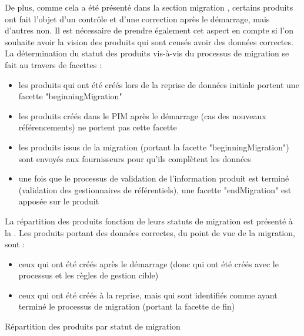                 De plus, comme cela a été présenté dans la section migration , certains produits ont fait l'objet d'un contrôle et d'une correction après le démarrage, mais d'autres non.
                Il est nécessaire de prendre également cet aspect en compte si l'on souhaite avoir la vision des produits qui sont censés avoir des données correctes.
                La détermination du statut des produits vis-à-vis du processus de migration se fait au travers de facettes :
                \begin{itemize}
                    \item les produits qui ont été créés lors de la reprise de données initiale portent une facette "beginningMigration"
                    \item les produits créés dans le PIM après le démarrage (cas des nouveaux référencements) ne portent pas cette facette
                    \item les produits issus de la migration (portant la facette "beginningMigration") sont envoyés aux fournisseurs pour qu'ils complètent les données 
                    \item une fois que le processus de validation de l'information produit est terminé (validation des gestionnaires de référentiels), une facette "endMigration" est apposée sur le produit
                \end{itemize}
                La répartition des produits fonction de leurs statuts de migration est présenté à la .
                Les produits portant des données correctes, du point de vue de la migration, sont : 
                \begin{itemize}
                    \item ceux qui ont été créés après le démarrage (donc qui ont été créés avec le processus et les règles de gestion cible)
                    \item ceux qui ont été créés à la reprise, mais qui sont identifiés comme ayant terminé le processus de migration (portant la facette de fin)
                \end{itemize}

                \begin{table}[htbp]
                    \begin{center}
                    
                    \caption{Répartition des produits par statut de migration}
                    \label{tbl:migration_status}
                    \end{center}
                \end{table}

